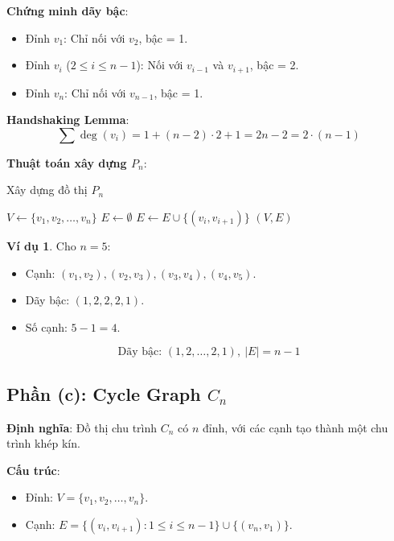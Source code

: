 \documentclass[a4paper,12pt]{article}
\theoremstyle{plain}
\theoremstyle{definition}
\newtheorem{example}{Ví dụ}
\begin{document}
\textbf{Chứng minh dãy bậc}:
\begin{itemize}
    \item Đỉnh \( v_1 \): Chỉ nối với \( v_2 \), bậc = 1.
    \item Đỉnh \( v_i \) (\( 2 \leq i \leq n-1 \)): Nối với \( v_{i-1} \) và \( v_{i+1} \), bậc = 2.
    \item Đỉnh \( v_n \): Chỉ nối với \( v_{n-1} \), bậc = 1.
\end{itemize}

\textbf{ Handshaking Lemma}:
\[
\sum \deg(v_i) = 1 + (n-2) \cdot 2 + 1 = 2n - 2 = 2 \cdot (n-1)
\]

\textbf{Thuật toán xây dựng \( P_n \)}:
\begin{algorithm}
\caption{Xây dựng đồ thị \( P_n \)}
\begin{algorithmic}
    \State $V \gets \{v_1, v_2, \ldots, v_n\}$
    \State $E \gets \emptyset$
        \State $E \gets E \cup \{(v_i, v_{i+1})\}$
    \EndFor
    \State \Return $(V, E)$
\EndFunction
\end{algorithmic}
\end{algorithm}

\begin{example}
Cho \( n=5 \):
\begin{itemize}
    \item Cạnh: \( (v_1, v_2), (v_2, v_3), (v_3, v_4), (v_4, v_5) \).
    \item Dãy bậc: \( (1, 2, 2, 2, 1) \).
    \item Số cạnh: \( 5-1 = 4 \).
\end{itemize}
\end{example}

\[
\boxed{\text{Dãy bậc: } (1, 2, \ldots, 2, 1), \ |E| = n-1}
\]

\subsection*{Phần (c): Cycle Graph \( C_n \)}

\textbf{Định nghĩa}: Đồ thị chu trình \( C_n \) có \( n \) đỉnh, với các cạnh tạo thành một chu trình khép kín.

\textbf{Cấu trúc}:
\begin{itemize}
    \item Đỉnh: \( V = \{v_1, v_2, \ldots, v_n\} \).
    \item Cạnh: \( E = \{(v_i, v_{i+1}) : 1 \leq i \leq n-1\} \cup \{(v_n, v_1)\} \).
\end{itemize}
\end{document}
